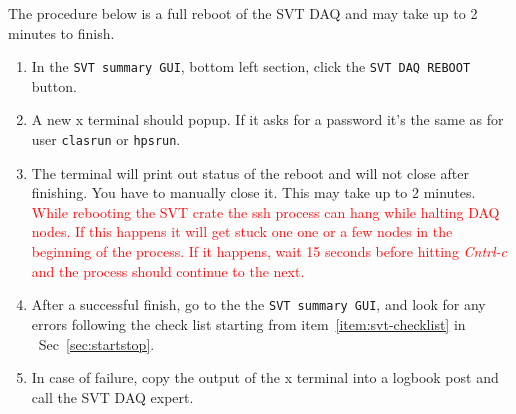 \documentclass[12pt]{article}
\begin{document}
The procedure below is a full reboot of the SVT DAQ and may take up to 2 minutes to finish. 

\begin{enumerate}

\item
In the \texttt{SVT summary GUI}, bottom left section, click the \texttt{SVT DAQ REBOOT} button.

\item
A new x terminal should popup. If it asks for a password it's the same as for user \texttt{clasrun} or \texttt{hpsrun}.

\item
The terminal will print out status of the reboot and will not close after finishing. You have to manually close it. \newline
This may take up to 2 minutes.\newline
\textcolor{red}{While rebooting the SVT crate the ssh process can hang while halting DAQ nodes. If this happens it will get stuck one one or a few nodes in the beginning of the process. If it happens, wait 15 seconds before hitting {\em Cntrl-c} and the process should continue to the next. }

\item 
After a successful finish, go to the the \texttt{SVT summary GUI}, and look for any errors following the check list starting from item~\ref{item:svt-checklist} in ~Sec~\ref{sec:startstop}.

\item
In case of failure, copy the output of the x terminal into a logbook post and call the SVT DAQ expert.



\end{enumerate}
\end{document}
